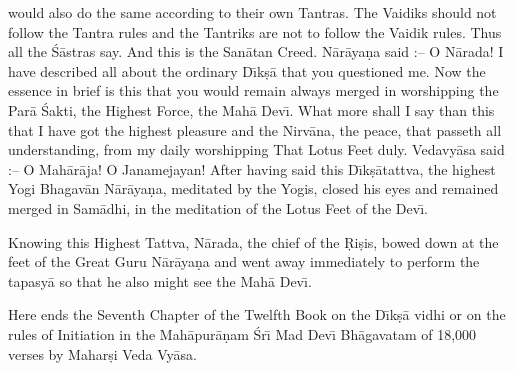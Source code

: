 would also do the same according to their own Tantras. The Vaidiks should not follow the Tantra rules and the Tantriks are not to follow the Vaidik rules. Thus all the \'S\=astras say. And this is the San\=atan Creed. N\=ar\=aya\d{n}a said :-- O N\=arada! I have described all about the ordinary D\={\i}k\d{s}\=a that you questioned me. Now the essence in brief is this that you would remain always merged in worshipping the Par\=a \'Sakti, the Highest Force, the Mah\=a Dev\={\i}. What more shall I say than this that I have got the highest pleasure and the Nirv\=ana, the peace, that passeth all understanding, from my daily worshipping That Lotus Feet duly. Vedavy\=asa said :-- O Mah\=ar\=aja! O Janamejayan! After having said this D\={\i}k\d{s}\=atattva, the highest Yogi Bhagav\=an N\=ar\=aya\d{n}a, meditated by the Yogis, closed his eyes and remained merged in Sam\=adhi, in the meditation of the Lotus Feet of the Dev\={\i}.

Knowing this Highest Tattva, N\=arada, the chief of the \d{R}i\d{s}is, bowed down at the feet of the Great Guru N\=ar\=aya\d{n}a and went away immediately to perform the tapasy\=a so that he also might see the Mah\=a Dev\={\i}.

Here ends the Seventh Chapter of the Twelfth Book on the D\={\i}k\d{s}\=a vidhi or on the rules of Initiation in the Mah\=apur\=a\d{n}am \'Sr\={\i} Mad Dev\={\i} Bh\=agavatam of 18,000 verses by Mahar\d{s}i Veda Vy\=asa.



